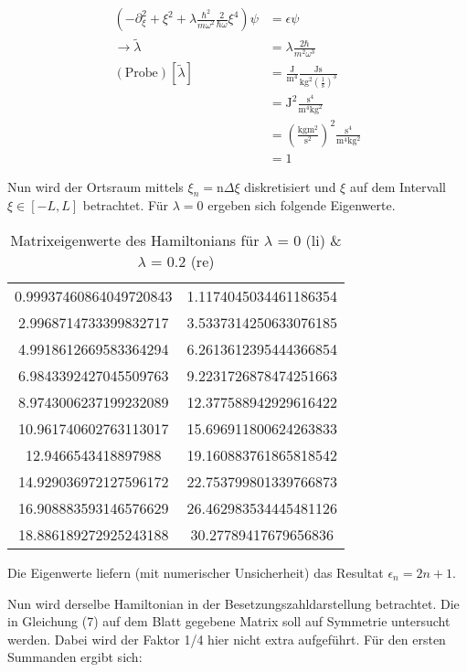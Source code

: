 \begin{align}
	\left( - \partial_{\xi}^2+\xi^2+\lambda \frac{\hbar^2}{m\omega^2}\frac{2}{\hbar \omega} \xi^4 \right) \psi &= \epsilon \psi \\
	\rightarrow \tilde{\lambda} &= \lambda \frac{ 2 \hbar }{m^2 \omega^3} \\
	\left(\text{Probe}\right)[\tilde{\lambda}] &= \frac{\mathup{J}}{\mathup{m^4}} \frac{\mathup{Js}}{\mathup{kg^2} \left(\frac{1}{\mathup{s}}\right)^3} \\
	&= \mathup{J^2} \frac{\mathup{s^4}}{\mathup{m^4kg^2}} \\
	&= \left( \frac{\mathup{kg m^2}}{\mathup{s^2}}\right)^2 \frac{\mathup{s^4}}{\mathup{m^4kg^2}}\\
	&= 1
\end{align}

Nun wird der Ortsraum mittels $\xi_n = \mathup{n} \Delta \xi$ diskretisiert und $\xi$ auf dem Intervall $\xi \in [-L,L]$ betrachtet. Für $\lambda = 0$ ergeben sich folgende Eigenwerte.
\begin{table}[]
\centering
\caption{Matrixeigenwerte des Hamiltonians für $\lambda$ = 0 (li) \& $\lambda$ = 0.2 (re)}
\label{table:2beigenvalues}
\begin{tabular}{cc}
0.99937460864049720843 &1.1174045034461186354 \\
2.9968714733399832717 &3.5337314250633076185 \\
4.9918612669583364294 &6.2613612395444366854\\
6.9843392427045509763 &9.2231726878474251663\\
8.9743006237199232089 &12.377588942929616422\\
10.961740602763113017 &15.696911800624263833\\
12.9466543418897988 &19.160883761865818542\\
14.929036972127596172&22.753799801339766873 \\
16.908883593146576629 &26.462983534445481126\\
18.886189272925243188 &30.27789417679656836\\
\end{tabular}
\end{table}

Die Eigenwerte liefern (mit numerischer Unsicherheit) das Resultat $\epsilon_n = 2n+1$.

Nun wird derselbe Hamiltonian in der Besetzungszahldarstellung betrachtet.
Die in Gleichung (7) auf dem Blatt gegebene Matrix soll auf Symmetrie untersucht werden. Dabei wird der Faktor 1/4 hier nicht extra aufgeführt. Für den ersten Summanden ergibt sich:

